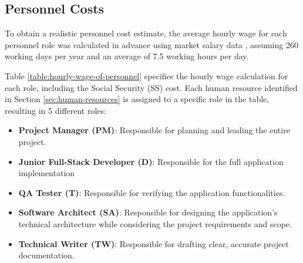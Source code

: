 \subsection{Personnel Costs}

To obtain a realistic personnel cost estimate, the average hourly wage for each personnel role was calculated in advance using market salary data \cite{annual-spain-salary}, assuming 260 working days per year and an average of 7.5 working hours per day.

Table  \ref{table:hourly-wage-of-personnel} specifies the hourly wage calculation for each role, including the Social Security (SS) cost. Each human resource identified in Section \ref{sec:human-resources} is assigned to a specific role in the table, resulting in 5 different roles:

\small
\begin{itemize}[leftmargin=0.75cm, noitemsep, label=\textbullet]
    \item \textbf{Project Manager (PM)}: Responsible for planning and leading the entire project.
    \item \textbf{Junior Full-Stack Developer (D)}: Responsible for the full application implementation
    \item \textbf{QA Tester (T)}: Responsible for verifying the application functionalities.
    \item \textbf{Software Architect (SA)}: Responsible for designing the application's technical architecture while considering the project requirements and scope.
    \item \textbf{Technical Writer (TW)}: Responsible for drafting clear, accurate project documentation.
\end{itemize}

\vspace{-10pt}

\normalsize

